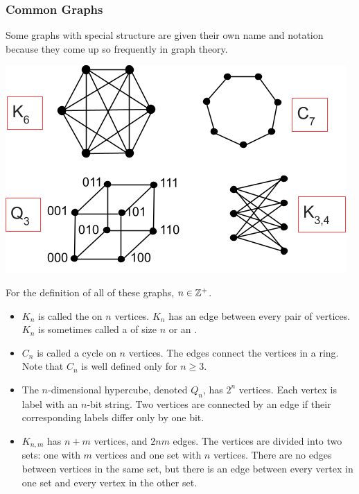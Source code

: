 \subsubsection*{Common Graphs}
Some graphs with special structure are given their own name and notation because they come up so frequently in graph theory.
\begin{center}
  \includegraphics[width=0.7\linewidth]{resources/common graphs.png}
\end{center}
For the definition of all of these graphs, $n \in \mathbb{Z}^+$.
\begin{itemize}
  \item $K_n$ is called the  on $n$ vertices. $K_n$ has an edge between every pair of vertices. $K_n$ is sometimes called a  of size $n$ or an .
  \item $C_n$ is called a cycle on $n$ vertices. The edges connect the vertices in a ring. Note that $C_n$ is well defined only for $n \geq 3$.
  \item The $n$-dimensional hypercube, denoted $Q_n$, has $2^n$ vertices. Each vertex is label with an $n$-bit string. Two vertices are connected by an edge if their corresponding labels differ only by one bit.
  \item $K_{n,m}$ has $n+m$ vertices, and $2nm$ edges. The vertices are divided into two sets: one with $m$ vertices and one set with $n$ vertices. There are no edges between vertices in the same set, but there is an edge between every vertex in one set and every vertex in the other set.
\end{itemize}

